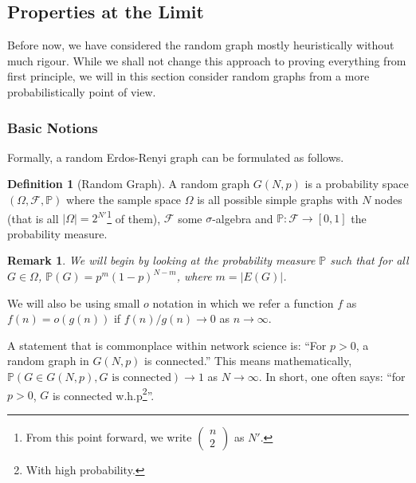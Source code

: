 \documentclass[
]{article}
\newtheorem*{remark}{Remark}
\theoremstyle{definition}
\newtheorem{definition}{Definition}[section]
\begin{document}
\hypertarget{properties-at-the-limit}{%
\subsection{Properties at the Limit}\label{properties-at-the-limit}}

Before now, we have considered the random graph mostly heuristically
without much rigour. While we shall not change this approach to proving
everything from first principle, we will in this section consider random
graphs from a more probabilistically point of view.

\hypertarget{basic-notions}{%
\subsubsection{Basic Notions}\label{basic-notions}}

Formally, a random Erdos-Renyi graph can be formulated as follows.

\begin{definition}[Random Graph]
  A random graph \(G(N, p)\) is a probability space \((\Omega, \mathcal{F}, \mathbb{P})\) 
  where the sample space \(\Omega\) is all possible simple graphs with \(N\) 
  nodes (that is all \(\left| \Omega \right| = 2^{N'}\)\footnote{From this point 
  forward, we write \(\begin{pmatrix} n \\ 2 \end{pmatrix}\) as \(N'\).} of them), 
  \(\mathcal{F}\) some \(\sigma\)-algebra and \(\mathbb{P} : \mathcal{F} \to [0, 1]\) 
  the probability measure. 
\end{definition}

\begin{remark}
  We will begin by looking at the probability measure \(\mathbb{P}\) such that 
  for all \(G \in \Omega\), \(\mathbb{P}(G) = p^m (1 - p)^{N - m}\), where 
  \(m = \left| E(G) \right|\).
\end{remark}

We will also be using small \(o\) notation in which we refer a function
\(f\) as \(f(n) = o(g(n))\) if \(f(n) / g(n) \to 0\) as
\(n \to \infty\).

A statement that is commonplace within network science is: ``For
\(p > 0\), a random graph in \(G(N, p)\) is connected.'' This means
mathematically,
\(\mathbb{P}(G \in G(N, p), G \text{ is connected}) \to 1\) as
\(N \to \infty\). In short, one often says: ``for \(p > 0\), \(G\) is
connected w.h.p\footnote{With high probability.}''.
\end{document}
